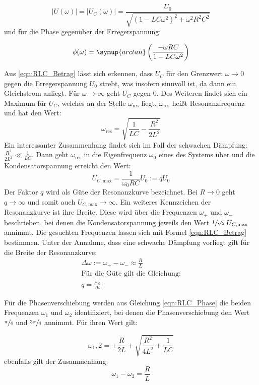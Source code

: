 \begin{equation}
    \label{eqn:RLC_Betrag}
    |U(\omega)| = |U_C(\omega)| = \frac{U_0}{\sqrt{(1-LC\omega^2)^2+\omega^2R^2C^2}}
\end{equation}
und für die Phase gegenüber der Erregerspannung:

\begin{equation}
    \label{eqn:RLC_Phase}
    \phi(\omega) = \symup{arctan}\left(\frac{-\omega RC}{1-LC\omega^2}\right)
\end{equation}

Aus \eqref{eqn:RLC_Betrag} lässt sich erkennen, dass $U_C$ für den Grenzwert $\omega \to 0$ gegen die Erregerspannung $U_0$
strebt, was insofern sinnvoll ist, da dann ein Gleichstrom anliegt. Für $\omega \to \infty$ geht $U_C$ gegen 0.
Des Weiteren findet sich ein Maximum für $U_C$, welches an der Stelle $\omega_{\text{res}}$ liegt.
$\omega_{\text{res}}$ heißt Resonanzfrequenz und hat den Wert:
\begin{equation}
    \label{eqn:Resonanzfrequenz}
    \omega_{\text{res}} = \sqrt{\frac{1}{LC}-\frac{R^2}{2L^2}}
\end{equation}
Ein interessanter Zusammenhang findet sich im Fall der schwachen Dämpfung: $\frac{R^2}{2L^2} \ll \frac{1}{LC}$. Dann geht $\omega_{\text{res}}$ 
in die Eigenfrequenz $\omega_0$ eines des Systems über und die Kondensatorspannung erreicht den Wert: 
\begin{equation}
    \label{eqn:Guete_Resonanzkurve}
    U_{C, \text{max}} = \frac{1}{\omega_0 RC} U_0 := q U_0
\end{equation}
Der Faktor $q$ wird als Güte der Resonanzkurve bezeichnet. Bei $R \to 0$ geht $q \to \infty$ und somit auch $U_{C, \text{max}} \to \infty$.
Ein weiteres Kennzeichen der Resonanzkurve ist ihre Breite. Diese wird über die Frequenzen $\omega_+$ und $\omega_-$ beschrieben, bei denen
die Kondensatorspannung jeweils den Wert $\sfrac{1}{\sqrt{2}}\; U_{C,\text{max}}$ annimmt. Die gesuchten Frequenzen lassen sich mit Formel
\eqref{eqn:RLC_Betrag} bestimmen. Unter der Annahme, dass eine schwache Dämpfung vorliegt gilt für die Breite der Resonanzkurve:
\begin{gather}
    \Delta\omega := \omega_+ - \omega_- \approx \frac{R}{L} \label{eqn:DeltaOmega} \\
    \text{Für die Güte gilt die Gleichung:} \nonumber \\
    q = \frac{\omega_0}{\Delta\omega}                       \label{eqn:Guete_Resonanzkurve2}
\end{gather}

Für die Phasenverschiebung werden aus Gleichung \eqref{eqn:RLC_Phase} die beiden Frequenzen $\omega_1$ und $\omega_2$ identifiziert, bei denen
die Phasenverschiebung den Wert $\sfrac{\pi}{4}$ und $\sfrac{3\pi}{4}$ annimmt. Für ihren Wert gilt:

\begin{equation}
    \label{eqn:w_1_w_2}
    \omega_1,2 = \pm \frac{R}{2L} + \sqrt{\frac{R^2}{4L^2}+\frac{1}{LC}}
\end{equation}
ebenfalls gilt der Zusammenhang:
\begin{equation}
    \label{eqn:w_1_w_2_2}
    \omega_1 - \omega_2 = \frac{R}{L}
\end{equation}